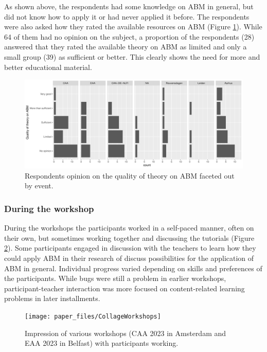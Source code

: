 \documentclass[
]{article}
\begin{document}
As shown above, the respondents had some knowledge on ABM in general, but did not know how to apply it or had never applied it before. The respondents were also asked how they rated the available resources on ABM (Figure \ref{fig:available-theory}). While 64 of them had no opinion on the subject, a proportion of the respondents (28) answered that they rated the available theory on ABM as limited and only a small group (39) as sufficient or better. This clearly shows the need for more and better educational material.

\begin{figure}
\centering
\includegraphics{paper_files/figure-latex/available-theory-1.pdf}
\caption{\label{fig:available-theory}Respondents opinion on the quality of theory on ABM faceted out by event.}
\end{figure}

\hypertarget{during-the-workshop}{%
\subsubsection{During the workshop}\label{during-the-workshop}}

During the workshops the participants worked in a self-paced manner, often on their own, but sometimes working together and discussing the tutorials (Figure \ref{fig:workshop-impression}). Some participants engaged in discussion with the teachers to learn how they could apply ABM in their research of discuss possibilities for the application of ABM in general. Individual progress varied depending on skills and preferences of the participants. While bugs were still a problem in earlier workshops, participant-teacher interaction was more focused on content-related learning problems in later installments.

\begin{figure}
\texttt{[image: paper\_files/CollageWorkshops]} \caption{Impression of various workshops (CAA 2023 in Amsterdam and EAA 2023 in Belfast) with participants working.}\label{fig:workshop-impression}
\end{figure}
\end{document}

